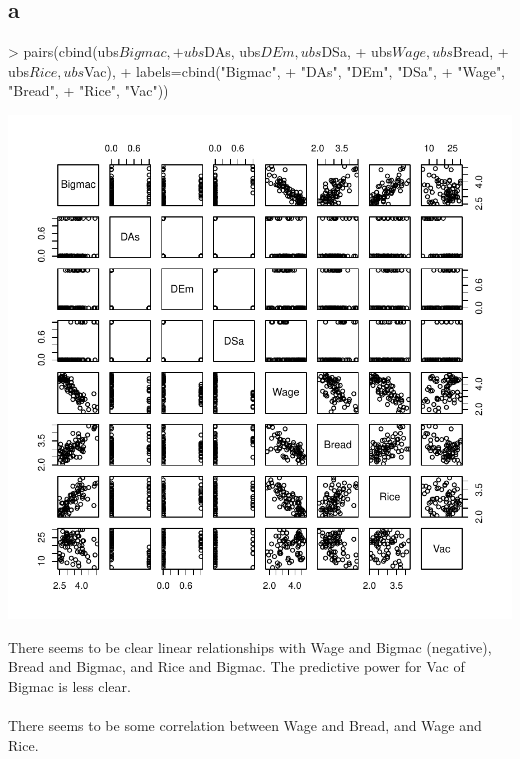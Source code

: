 \documentclass{article}
\begin{document}
\subsection*{a}
\begin{Schunk}
\begin{Sinput}
> pairs(cbind(ubs$Bigmac, 
+             ubs$DAs, ubs$DEm, ubs$DSa, 
+             ubs$Wage, ubs$Bread, 
+             ubs$Rice, ubs$Vac), 
+       labels=cbind("Bigmac", 
+                    "DAs", "DEm", "DSa", 
+                    "Wage", "Bread", 
+                    "Rice", "Vac"))
\end{Sinput}
\end{Schunk}
\includegraphics{RegressionFinal-002}

There seems to be clear linear relationships with Wage and Bigmac (negative), Bread and Bigmac, and Rice and Bigmac. The predictive power for Vac of Bigmac is less clear.  
\\\\
There seems to be some correlation between Wage and Bread, and Wage and Rice. 
\end{document}
